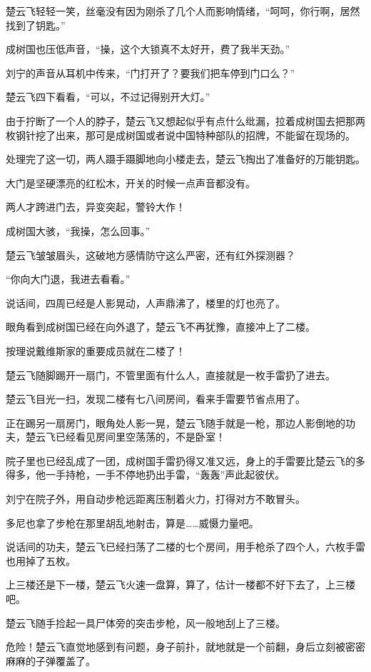 楚云飞轻轻一笑，丝毫没有因为刚杀了几个人而影响情绪，“呵呵，你行啊，居然找到了钥匙。”

成树国也压低声音，“操，这个大锁真不太好开，费了我半天劲。”

刘宁的声音从耳机中传来，“门打开了？要我们把车停到门口么？”

楚云飞四下看看，“可以，不过记得别开大灯。”

由于拧断了一个人的脖子，楚云飞又想起似乎有点什么纰漏，拉着成树国去把那两枚钢针挖了出来，那可是成树国或者说中国特种部队的招牌，不能留在现场的。

处理完了这一切，两人蹑手蹑脚地向小楼走去，楚云飞掏出了准备好的万能钥匙。

大门是坚硬漂亮的红松木，开关的时候一点声音都没有。

两人才跨进门去，异变突起，警铃大作！

成树国大骇，“我操，怎么回事。”

楚云飞皱皱眉头，这破地方感情防守这么严密，还有红外探测器？

“你向大门退，我进去看看。”

说话间，四周已经是人影晃动，人声鼎沸了，楼里的灯也亮了。

眼角看到成树国已经在向外退了，楚云飞不再犹豫，直接冲上了二楼。

按理说戴维斯家的重要成员就在二楼了！

楚云飞随脚踢开一扇门，不管里面有什么人，直接就是一枚手雷扔了进去。

楚云飞目光一扫，发现二楼有七八间房间，看来手雷要节省点用了。

正在踢另一扇房门，眼角处人影一晃，楚云飞随手就是一枪，那边人影倒地的功夫，楚云飞已经看见房间里空荡荡的，不是卧室！

院子里也已经乱成了一团，成树国手雷扔得又准又远，身上的手雷要比楚云飞的多得多，他一手持枪，一手不停地扔出手雷，“轰轰”声此起彼伏。

刘宁在院子外，用自动步枪远距离压制着火力，打得对方不敢冒头。

多尼也拿了步枪在那里胡乱地射击，算是……威慑力量吧。

说话间的功夫，楚云飞已经扫荡了二楼的七个房间，用手枪杀了四个人，六枚手雷也用掉了五枚。

上三楼还是下一楼，楚云飞火速一盘算，算了，估计一楼都不好下去了，上三楼吧。

楚云飞随手捡起一具尸体旁的突击步枪，风一般地刮上了三楼。

危险！楚云飞直觉地感到有问题，身子前扑，就地就是一个前翻，身后立刻被密密麻麻的子弹覆盖了。

